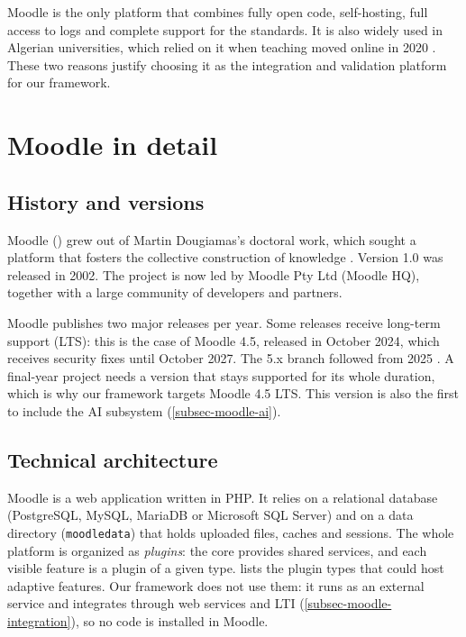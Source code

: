 
Moodle is the only platform that combines fully open code, self-hosting,
full access to logs and complete support for the standards. It is also
widely used in Algerian universities, which relied on it when teaching
moved online in 2020 \cite{kerrouzi2023}. These two reasons justify
choosing it as the integration and validation platform for our framework.

\section{Moodle in detail}
\label{sec-moodle}

\subsection{History and versions}

Moodle ()
grew out of Martin Dougiamas's doctoral work, which sought a platform that
fosters the collective construction of knowledge \cite{dougiamas2003}.
Version 1.0 was released in 2002. The project is now led by Moodle Pty Ltd
(Moodle HQ), together with a large community of developers and partners.

Moodle publishes two major releases per year. Some releases receive
long-term support (LTS): this is the case of Moodle 4.5, released in
October 2024, which receives security fixes until October 2027. The 5.x
branch followed from 2025 \cite{moodle_versions}. A final-year project
needs a version that stays supported for its whole duration, which is why
our framework targets Moodle 4.5 LTS. This version is also the first to
include the AI subsystem (\cref{subsec-moodle-ai}).

\subsection{Technical architecture}

Moodle is a web application written in PHP. It relies on a relational
database (PostgreSQL, MySQL, MariaDB or Microsoft SQL Server) and
on a data directory (\texttt{moodledata}) that holds uploaded files, caches and
sessions. The whole platform is organized as \emph{plugins}: the core
provides shared services, and each visible feature is a plugin of a given
type.  lists the plugin types that could host
adaptive features. Our framework does not use them: it runs as an external
service and integrates through web services and LTI
(\cref{subsec-moodle-integration}), so no code is installed in Moodle.

